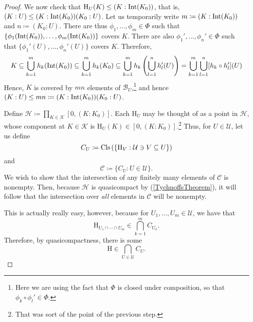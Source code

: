 \begin{thm}
\begin{savenotes}
\begin{proof}
We now check that $\mathrm{H}_U(K)\leq (K:\operatorname{Int} (K_0))$, that is, $(K:U)\leq (K:\operatorname{Int} (K_0))(K_0:U)$.  Let us temporarily write $m\coloneqq (K:\operatorname{Int} (K_0))$ and $n\coloneqq (K_0:U)$.  There are thus $\phi _1,\ldots ,\phi _m\in \Phi$ such that $\{ \phi _1(\operatorname{Int} (K_0)),\ldots ,\phi _m(\operatorname{Int} (K_0))\}$ covers $K$.  There are also $\phi _1',\ldots ,\phi _n'\in \Phi$ such that $\{ \phi _1'(U),\ldots ,\phi _n'(U)\}$ covers $K$.  Therefore,
\begin{equation}
K\subseteq \bigcup _{k=1}^mh_k(\operatorname{Int} (K_0))\subseteq \bigcup _{k=1}^mh_k(K_0)\subseteq \bigcup _{k=1}^mh_k\left( \bigcup _{l=1}^nh_l'(U)\right) =\bigcup _{k=1}^m\bigcup _{l=1}^n[h_k\circ h_l'](U)
\end{equation}
Hence, $K$ is covered by $mn$ elements of $\mathcal{B}_U$,\footnote{Here we are using the fact that $\Phi$ is closed under composition, so that $\phi _k\circ \phi _l'\in \Phi$.} and hence $(K:U)\leq mn\coloneqq (K:\operatorname{Int} (K_0))(K_0:U)$.

\label{Haar.4x}
Define $\mathcal{H}\coloneqq \prod _{K\in \mathcal{K}}[0,(K:K_0)]$.  Each $\mathrm{H}_U$ may be thought of as a point in $\mathcal{H}$, whose component at $K\in \mathcal{K}$ is $\mathrm{H}_U(K)\in [0,(K:K_0)]$.\footnote{That was sort of the point of the previous step.}  Thus, for $U\in \mathcal{U}$, let us define
\begin{equation}
C_U\coloneqq \operatorname{Cls} \left( \left\{ \mathrm{H}_V:\mathcal{U}\ni V\subseteq U\right\} \right) 
\end{equation}
and
\begin{equation}
\mathcal{C}\coloneqq \{ C_U:U\in \mathcal{U}\} .
\end{equation}
We wish to show that the intersection of any finitely many elements of $\mathcal{C}$ is nonempty.  Then, because $\mathcal{H}$ is quasicompact by  (\cref{TychnoffsTheorem}), it will follow that the intersection over \emph{all} elements in $\mathcal{C}$ will be nonempty.

This is actually really easy, however, because for $U_1,\ldots ,U_m\in \mathcal{U}$, we have that
\begin{equation}
\mathrm{H}_{U_1\cap \cdots \cap U_m}\in \bigcap _{k=1}^mC_{U_k}.
\end{equation}
Therefore, by quasicompactness, there is some
\begin{equation}
\mathrm{H}\in \bigcap _{U\in \mathcal{U}}C_U.
\end{equation}


\end{proof}
\end{savenotes}
\end{thm}
